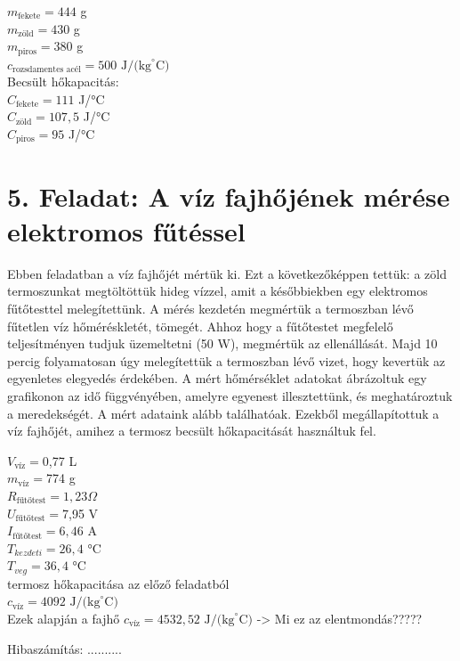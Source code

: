 \documentclass{article}
\begin{document}
$m_{\text{fekete}}=444$ g\\
$m_{\text{zöld}}=430$ g\\
$m_{\text{piros}}=380$ g\\
$c_{\text{rozsdamentes acél}}=500 \text{ J/(kg}^{\circ}\text{C)}$\\
Becsült hőkapacitás:\\
$C_{\text{fekete}}=111$ J/°C\\
$C_{\text{zöld}}=107,5$ J/°C\\
$C_{\text{piros}}=95$ J/°C\\


\section*{5. Feladat: A víz fajhőjének mérése elektromos fűtéssel}

Ebben feladatban a víz fajhőjét mértük ki. Ezt a következőképpen tettük: a zöld termoszunkat megtöltöttük hideg vízzel, amit a későbbiekben egy elektromos fűtőtesttel melegítettünk. A mérés kezdetén megmértük a termoszban lévő fűtetlen víz hőméréskletét, tömegét. Ahhoz hogy a fűtőtestet megfelelő teljesítményen tudjuk üzemeltetni (50 W), megmértük az ellenállását. Majd 10 percig folyamatosan úgy melegítettük a termoszban lévő vizet, hogy kevertük az egyenletes elegyedés érdekében.
A mért hőmérséklet adatokat ábrázoltuk egy grafikonon az idő függvényében, amelyre egyenest illesztettünk, és meghatároztuk a meredekségét. A mért adataink alább találhatóak. Ezekből megállapítottuk a víz fajhőjét, amihez a termosz becsült hőkapacitását használtuk fel.

$V_{\text{víz}}=$0,77 L\\
$m_{\text{víz}}=$774 g\\
$R_{\text{fűtőtest}}=1,23 \Omega$\\
$U_{\text{fűtőtest}}=$7,95 V\\
$I_{\text{fűtőtest}}=6,46$ A\\
$T_{kezdeti}=26,4$ °C\\
$T_{veg}=36,4$ °C\\
termosz hőkapacitása az előző feladatból\\
$c_{\text{víz}}=4092 \text{ J/(kg}^{\circ}\text{C)}$\\

Ezek alapján a fajhő $c_{\text{víz}}=4532,52 \text{ J/(kg}^{\circ}\text{C)}$
-> Mi ez az elentmondás?????

Hibaszámítás: ..........
\end{document}
